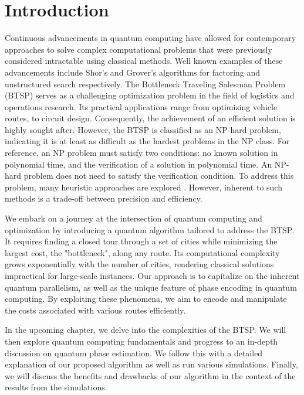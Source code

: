 \documentclass[msc,oneside]{ubcthesis}
\begin{document}
	
	\mainmatter
	
	\chapter{Introduction}

	
	
Continuous advancements in quantum computing have allowed for contemporary approaches to solve complex computational problems that were previously considered intractable using classical methods. Well known examples of these advancements include Shor's \cite{Shor} and Grover's \cite{grover1996fast} algorithms for factoring and unstructured search respectively. The Bottleneck Traveling Salesman Problem (BTSP) serves as a challenging optimization problem in the field of logistics and operations research. Its practical applications range from optimizing vehicle routes, to circuit design. Consequently, the achievement of an efficient solution is highly sought after. However, the BTSP is classified as an NP-hard problem, indicating it is at least as difficult as the hardest problems in the NP class. For reference, an NP problem must satisfy two conditions: no known solution in polynomial time, and the verification of a solution in polynomial time. An NP-hard problem does not need to satisfy the verification condition. To address this problem, many heuristic approaches are explored \cite{heuristicthesis}\cite{heuristic}. However, inherent to such methods is a trade-off between precision and efficiency.

We embark on a journey at the intersection of quantum computing and optimization by introducing a quantum algorithm tailored to address the BTSP. It requires finding a closed tour through a set of cities while minimizing the largest cost, the "bottleneck", along any route. Its computational complexity grows exponentially with the number of cities, rendering classical solutions impractical for large-scale instances. Our approach is to capitalize on the inherent quantum parallelism, as well as the unique feature of phase encoding in quantum computing. By exploiting these phenomena, we aim to encode and manipulate the costs associated with various routes efficiently. 

In the upcoming chapter, we delve into the complexities of the BTSP. We will then explore quantum computing fundamentals and progress to an in-depth discussion on quantum phase estimation. We follow this with a detailed explanation of our proposed algorithm as well as run various simulations. Finally, we will discuss the benefits and drawbacks of our algorithm in the context of the results from the simulations.
	
\end{document}
